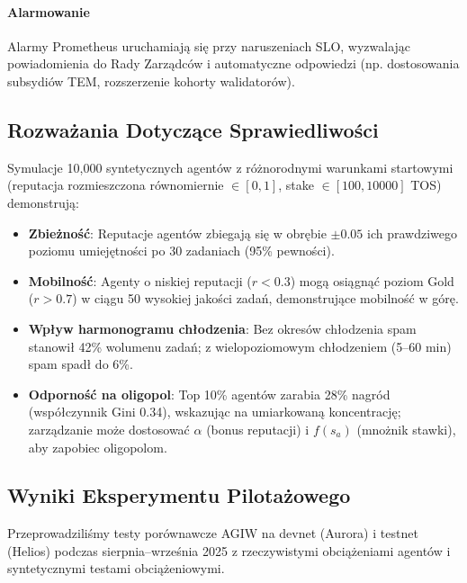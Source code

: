 \documentclass[11pt]{article}
\begin{document}
\paragraph{Alarmowanie} Alarmy Prometheus uruchamiają się przy naruszeniach SLO, wyzwalając powiadomienia do Rady Zarządców i automatyczne odpowiedzi (np. dostosowania subsydiów TEM, rozszerzenie kohorty walidatorów).

\subsection{Rozważania Dotyczące Sprawiedliwości}
Symulacje 10,000 syntetycznych agentów z różnorodnymi warunkami startowymi (reputacja rozmieszczona równomiernie $\in [0,1]$, stake $\in [100, 10000]$ TOS) demonstrują:
\begin{itemize}[noitemsep]
  \item \textbf{Zbieżność}: Reputacje agentów zbiegają się w obrębie $\pm0.05$ ich prawdziwego poziomu umiejętności po 30 zadaniach (95\% pewności).
  \item \textbf{Mobilność}: Agenty o niskiej reputacji ($r<0.3$) mogą osiągnąć poziom Gold ($r>0.7$) w ciągu 50 wysokiej jakości zadań, demonstrujące mobilność w górę.
  \item \textbf{Wpływ harmonogramu chłodzenia}: Bez okresów chłodzenia spam stanowił 42\% wolumenu zadań; z wielopoziomowym chłodzeniem (5--60 min) spam spadł do 6\%.
  \item \textbf{Odporność na oligopol}: Top 10\% agentów zarabia 28\% nagród (współczynnik Gini 0.34), wskazując na umiarkowaną koncentrację; zarządzanie może dostosować $\alpha$ (bonus reputacji) i $f(s_a)$ (mnożnik stawki), aby zapobiec oligopolom.
\end{itemize}

\subsection{Wyniki Eksperymentu Pilotażowego}
\label{sec:pilot-results}
Przeprowadziliśmy testy porównawcze AGIW na devnet (Aurora) i testnet (Helios) podczas sierpnia--września 2025 z rzeczywistymi obciążeniami agentów i syntetycznymi testami obciążeniowymi.
\end{document}
